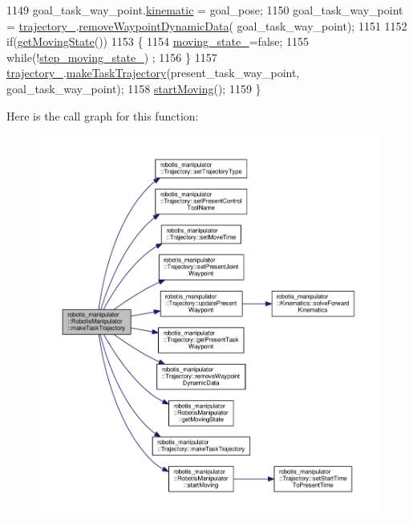 \begin{DoxyCode}
1149   goal\_task\_way\_point.\hyperlink{structrobotis__manipulator_1_1_pose_a7215a37d50e62643f1523d3fa40a36e9}{kinematic} = goal\_pose;
1150   goal\_task\_way\_point = \hyperlink{classrobotis__manipulator_1_1_robotis_manipulator_a992d2c7221bcaab8e9a688d12728d738}{trajectory\_}.\hyperlink{classrobotis__manipulator_1_1_trajectory_a3e05d461f6bdf874a58a6a35ff6ce351}{removeWaypointDynamicData}(
      goal\_task\_way\_point);
1151 
1152   \textcolor{keywordflow}{if}(\hyperlink{classrobotis__manipulator_1_1_robotis_manipulator_afa3c8994013b876eb38f22b4128f147a}{getMovingState}())
1153   \{
1154     \hyperlink{classrobotis__manipulator_1_1_robotis_manipulator_a5b7990548dd779b1ca66a2ad83a74f76}{moving\_state\_}=\textcolor{keyword}{false};
1155     \textcolor{keywordflow}{while}(!\hyperlink{classrobotis__manipulator_1_1_robotis_manipulator_aef8766eb10814f57928dcd9e71ceaccf}{step\_moving\_state\_}) ;
1156   \}
1157   \hyperlink{classrobotis__manipulator_1_1_robotis_manipulator_a992d2c7221bcaab8e9a688d12728d738}{trajectory\_}.\hyperlink{classrobotis__manipulator_1_1_trajectory_a5d93fd05d5c8faa50286fc9b2c662744}{makeTaskTrajectory}(present\_task\_way\_point, goal\_task\_way\_point);
1158   \hyperlink{classrobotis__manipulator_1_1_robotis_manipulator_a471cb5d00c34dfe28fd260daaf4fd7a7}{startMoving}();
1159 \}
\end{DoxyCode}


Here is the call graph for this function\+:\nopagebreak
\begin{figure}[H]
\begin{center}
\leavevmode
\includegraphics[width=350pt]{classrobotis__manipulator_1_1_robotis_manipulator_a80958a2678b01cdfcdf2cf2dcfc1f97d_cgraph}
\end{center}
\end{figure}


